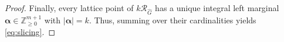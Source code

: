 \documentclass[10pt,a4paper]{amsart}
\newcommand{\Z}{\mathbb{Z}}
\newcommand{\vct}[1]{\boldsymbol{#1}}
\begin{document}
\begin{proof}
Finally, every lattice point of $k\mathcal R_{\widehat G}$ has a unique integral left marginal $\vct{\alpha}\in\Z_{\ge0}^{m+1}$ with $|\vct{\alpha}|=k$. Thus, summing over their cardinalities yields \eqref{eq:slicing}.
\end{proof}
\end{document}
